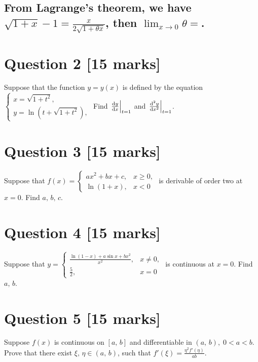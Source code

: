 \documentclass[12pt]{ctexart}
\begin{document}
\subsection{From Lagrange's theorem, we have \(\sqrt{1+x}-1=\frac{x}{2\sqrt{1+\theta x}}\), then \(\lim_{x\rightarrow0}\theta=\)\blank.}
\pagebreak
\section{\bf Question 2 [15 marks]}
Suppose that the function \(y=y(x)\) is defined by the equation \(\begin{cases}x=\sqrt{1+t^{2}},\\y=\ln(t+\sqrt{1+t^{2}}),\end{cases}\) Find \(\eval{\dv{y}{x}}_{t=1}\) and \(\eval{\dv[2]{y}{x}}_{t=1}\).
\section{\bf Question 3 [15 marks]}
Suppose that \(f(x)=\begin{cases}ax^{2}+bx+c,{}&x\ge0,\\\ln(1+x),{}&x<0\end{cases}\) is derivable of order two at \(x=0\). Find \(a,\,b,\,c\).
\section{\bf Question 4 [15 marks]}
Suppose that \(y=\begin{cases}\frac{\ln(1-x)+a\sin{x}+bx^{2}}{x^{2}},{}&x\ne0,\\\frac{5}{2},{}&x=0\end{cases}\) is continuous at \(x=0\). Find \(a,\,b\).
\section{\bf Question 5 [15 marks]}
Suppose \(f(x)\) is continuous on \([a,\,b]\) and differentiable in \((a,\,b),\;0<a<b\). Prove that there exist \(\xi,\,\eta\in(a,\,b)\), such that \(f'(\xi)=\frac{\eta^{2}f'(\eta)}{ab}\).
\end{document}
